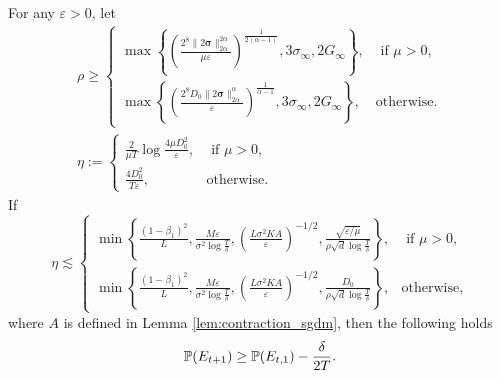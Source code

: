 \documentclass{article} %
\numberwithin{equation}{section}
\begin{document}
\begin{lemma}\label{lem:descent_sgdm}
    For any $\varepsilon>0$, let 
    \begin{equation}
        \begin{array}{l}
            \rho\geq \left\{
                \begin{array}{ll}
                    \max\left\{\left(\frac{2^8\|2\boldsymbol{\sigma}\|_{2\alpha}^{2\alpha}}{\mu\varepsilon}\right)^{\frac{1}{2(\alpha-1)}}, 3\sigma_\infty, 2G_{\infty}\right\}, & \text{ if $\mu>0$}, \\
                    \max\left\{\left(\frac{2^8D_0\|2\boldsymbol{\sigma}\|_{2\alpha}^{\alpha}}{\varepsilon}\right)^{\frac{1}{\alpha-1}}, 3\sigma_\infty, 2G_{\infty}\right\}, & \text{otherwise}.
                \end{array} 
                \right. \\
            \eta:= \left\{
                \begin{array}{ll}
                    \frac{2}{\mu T}\log\frac{4\mu D_0^2}{\varepsilon}, & \text{ if $\mu>0$}, \\
                    \frac{4D_0^2}{T\varepsilon}, & \text{otherwise}.
                \end{array}
                \right.
        \end{array}
    \end{equation}
    If 
    \begin{equation}
        \eta\lesssim \left\{
            \begin{array}{ll}
                \min\left\{\frac{(1-\beta_1)^2}{L}, \frac{M\varepsilon}{\sigma^2\log\frac{T}{\delta}}, \left(\frac{L\sigma^2KA}{\varepsilon}\right)^{-1/2}, \frac{\sqrt{\varepsilon/\mu}}{\rho\sqrt{d}\log\frac{T}{\delta}} \right\}, & \text{ if $\mu>0$}, \\
                \min\left\{\frac{(1-\beta_1)^2}{L}, \frac{M\varepsilon}{\sigma^2\log\frac{T}{\delta}}, \left(\frac{L\sigma^2KA}{\varepsilon}\right)^{-1/2}, \frac{D_0}{\rho\sqrt{d}\log\frac{T}{\delta}} \right\}, & \text{otherwise},
            \end{array}
        \right.
    \end{equation} 
    where $A$ is defined in Lemma \ref{lem:contraction_sgdm}, then the following holds
    \begin{equation}
        \mathbb{P}(E_{t+1}) \geq \mathbb{P}(E_{t,1})-\frac{\delta}{2T}.
    \end{equation}
\end{lemma}
\end{document}
